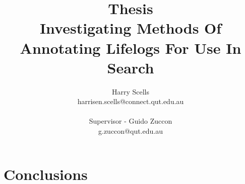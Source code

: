 \documentclass[12pt,a4paper]{book}
\begin{document}
\title{\small Thesis\\\huge Investigating Methods Of Annotating Lifelogs For Use In Search}

\author{Harry Scells\\harrisen.scells@connect.qut.edu.au\\\\\small Supervisor - Guido Zuccon\\\small g.zuccon@qut.edu.au\\}
\maketitle
\pagebreak
\tableofcontents
\pagebreak








\chapter{Conclusions}




\end{document}
